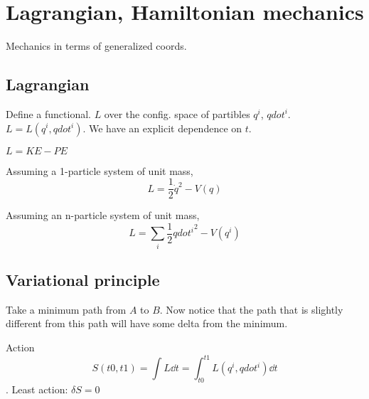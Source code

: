 \newcommand{\qdot}{{\dot q}}

\chapter{Lagrangian, Hamiltonian mechanics}

Mechanics in terms of generalized coords.
\section{Lagrangian}
Define a functional. $L$ over the config. space of partibles $q^i$, $qdot^i$.
$L = L(q^i, qdot^i)$.  We have an explicit dependence on $t$.



$L = KE - PE$

Assuming a 1-particle system of unit mass,
$$L = \frac{1}{2} \qdot^2 - V(q)$$

Assuming an n-particle system of unit mass,
$$L = \sum_i \frac{1}{2} {qdot^i}^2 - V(q^i)$$ 

\section{Variational principle}

Take a minimum path from $A$ to $B$. Now notice that the path that is
slightly different from this path will have some delta from the minimum.

Action
$$S(t0, t1) = \int L \dd t = \int_{t0}^{t1} L(q^i, qdot^i) \dd t$$.
Least action: $\delta S = 0$




